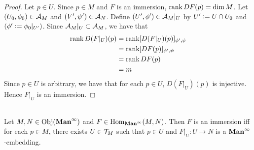 \documentclass{book}
\begin{document}
	\begin{proof}
		Let $p \in U$. Since $p \in M$ and $F$ is an immersion, $\operatorname{\text{rank}} DF(p) = \dim M$. Let $(U_0, \phi_0) \in \mathcal{A}_M$ and $(V', \psi') \in \mathcal{A}_N$. Define $(U', \phi') \in \mathcal{A}_M|_U$ by $U' \vcentcolon= U \cap U_0$ and $(\phi' \vcentcolon= \phi_0|_{U'})$. Since $\mathcal{A}_M|_U \subset \mathcal{A}_M$, we have that
		\begin{align*}
			\operatorname{\text{rank}} D(F|_U)(p)
			& = \operatorname{\text{rank}} [D(F|_U)(p)]_{\phi', \psi} \\
			& = \operatorname{\text{rank}} [DF(p)]_{\phi', \psi} \\
			& = \operatorname{\text{rank}} DF(p) \\
			& = m
		\end{align*}
		Since $p \in U$ is arbitrary, we have that for each $p \in U$, $D(F|_U)(p)$ is injective. Hence $F|_U$ is an immersion.  
	\end{proof}

	\begin{ex}   \\
		Let $M, N \in \operatorname{Obj}(\operatorname*{\text{\textbf{Man}}^{\infty}})$ and $F \in \operatorname{Hom}_{\operatorname*{\text{\textbf{Man}}^{\infty}}}(M, N)$. Then $F$ is an immersion iff for each $p \in M$, there exists $U \in \mathcal{T}_M$ such that $p \in U$ and $F|_U:U \rightarrow N$ is a $\operatorname*{\text{\textbf{Man}}^{\infty}}$-embedding. 
	\end{ex}
\end{document}
